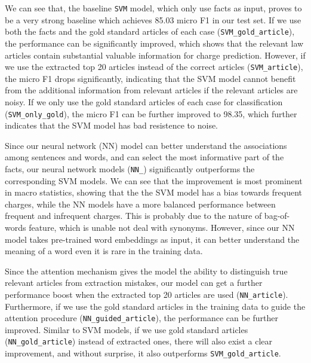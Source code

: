 We can see that, the baseline \texttt{SVM} model, which only use facts as input, proves to be a very strong baseline which achieves 85.03 micro F1 in our test set. If we use both the facts and the gold standard articles of each case (\texttt{SVM\_gold\_article}), the performance can be significantly improved, which shows that the relevant law articles contain substantial valuable information for charge prediction. However, if we use the extracted top 20 articles instead of the correct articles (\texttt{SVM\_article}), the micro F1 drops significantly, indicating that the SVM model cannot benefit from the additional information from relevant articles if the relevant articles are noisy. If we only use the gold standard articles of each case for classification (\texttt{SVM\_only\_gold}), the micro F1 can be further improved to 98.35, which further indicates that the SVM model has bad resistence to noise. 

Since our neural network (NN) model can better understand the associations among sentences and words, and can select the most informative part of the facts, our neural network models (\texttt{NN\_}) significantly outperforms the corresponding SVM models. 
We can see that the improvement is most prominent in macro statistics, showing that the the SVM model has a  bias towards frequent charges, while the NN models have a more balanced performance between frequent and infrequent charges. This is probably due to the nature of bag-of-words feature, which is unable not deal with synonyms. However, since our NN model takes pre-trained word embeddings as input, it can better understand the meaning of a word even it is rare in the training data. 

Since the attention mechanism gives the model the ability to distinguish true relevant articles from extraction mistakes, our model can get a further performance boost when the extracted top 20 articles are used (\texttt{NN\_article}). Furthermore, if we use the gold standard articles in the training data to guide the attention procedure (\texttt{NN\_guided\_article}), the performance can be further improved. Similar to SVM models, if we use gold standard articles (\texttt{NN\_gold\_article}) instead of extracted ones, there will also exist a clear improvement, and without surprise, it also outperforms \texttt{SVM\_gold\_article}.


